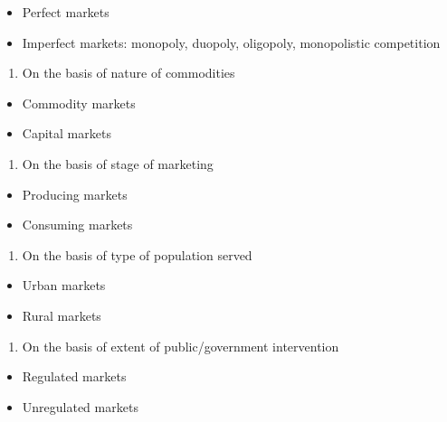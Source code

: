 \documentclass[11pt,]{book}
\providecommand{\tightlist}{%
  \setlength{\itemsep}{0pt}\setlength{\parskip}{0pt}}
\theoremstyle{definition}
\theoremstyle{definition}
\theoremstyle{definition}
\theoremstyle{remark}
\begin{document}
\begin{itemize}
\tightlist
\item
  Perfect markets
\item
  Imperfect markets: monopoly, duopoly, oligopoly, monopolistic
  competition
\end{itemize}

\begin{enumerate}
\def\labelenumi{\arabic{enumi}.}
\setcounter{enumi}{7}
\tightlist
\item
  On the basis of nature of commodities
\end{enumerate}

\begin{itemize}
\tightlist
\item
  Commodity markets
\item
  Capital markets
\end{itemize}

\begin{enumerate}
\def\labelenumi{\arabic{enumi}.}
\setcounter{enumi}{8}
\tightlist
\item
  On the basis of stage of marketing
\end{enumerate}

\begin{itemize}
\tightlist
\item
  Producing markets
\item
  Consuming markets
\end{itemize}

\begin{enumerate}
\def\labelenumi{\arabic{enumi}.}
\setcounter{enumi}{9}
\tightlist
\item
  On the basis of type of population served
\end{enumerate}

\begin{itemize}
\tightlist
\item
  Urban markets
\item
  Rural markets
\end{itemize}

\begin{enumerate}
\def\labelenumi{\arabic{enumi}.}
\setcounter{enumi}{10}
\tightlist
\item
  On the basis of extent of public/government intervention
\end{enumerate}

\begin{itemize}
\tightlist
\item
  Regulated markets
\item
  Unregulated markets
\end{itemize}
\end{document}

